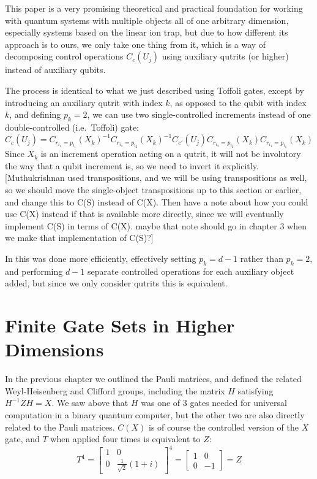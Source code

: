 This paper is a very promising theoretical and practical foundation for working with quantum systems with multiple objects all of one arbitrary dimension, especially systems based on the linear ion trap, but due to how different its approach is to ours, we only take one thing from it, which is a way of decomposing control operations $C_c(U_j)$ using auxiliary qutrits (or higher) instead of auxiliary qubits.

The process is identical to what we just described using Toffoli gates, except by introducing an auxiliary qutrit with index $k$, as opposed to the qubit with index $k$, and defining $p_k = 2$, we can use two single-controlled increments instead of one double-controlled (i.e.\ Toffoli) gate:
\[
C_c(U_j) = C_{r_{i_1}=p_{i_1}}(X_k)^{-1}
C_{r_{i_2}=p_{i_2}}(X_k)^{-1}
C_{c'}(U_j)
C_{r_{i_2}=p_{i_2}}(X_k)
C_{r_{i_1}=p_{i_1}}(X_k)
\]
Since $X_k$ is an increment operation acting on a qutrit, it will not be involutory the way that a qubit increment is, so we need to invert it explicitly. [Muthukrishnan used transpositions, and we will be using transpositions as well, so we should move the single-object transpositions up to this section or earlier, and change this to C(S) instead of C(X). Then have a note about how you could use C(X) instead if that is available more directly, since we will eventually implement C(S) in terms of C(X). maybe that note should go in chapter 3 when we make that implementation of C(S)?]

In \cite{multi-valued-logic} this was done more efficiently, effectively setting $p_k = d-1$ rather than $p_k = 2$, and performing $d-1$ separate controlled operations for each auxiliary object added, but since we only consider qutrits this is equivalent.

\section{Finite Gate Sets in Higher Dimensions}
In the previous chapter we outlined the Pauli matrices, and defined the related Weyl-Heisenberg and Clifford groups, including the matrix $H$ satisfying $H^{-1}ZH = X$. We saw above that $H$ was one of 3 gates needed for universal computation in a binary quantum computer, but the other two are also directly related to the Pauli matrices. $C(X)$ is of course the controlled version of the $X$ gate, and $T$ when applied four times is equivalent to $Z$:
\[
T^4 = \left[\begin{matrix}
1 & 0 \\
0 & \frac{1}{\sqrt{2}}(1+i)
\end{matrix}\right]^4 = \left[\begin{matrix}
1 & 0 \\
0 & -1
\end{matrix}\right] = Z\]

